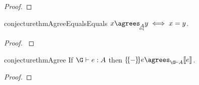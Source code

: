 
\begin{proof}
\end{proof}

\begin{restatable}{conjecture}{thmAgreeEqualsEquals}
  \(x \agrees_{\eqt A} y \iff x = y\).
\end{restatable}
\begin{proof}
  \label{thm:agree-equals-equals}
\end{proof}

\begin{restatable}{conjecture}{thmAgree}
  If $\J e \G A$
  then $\incdens{e} \agrees_{\G \vdash A} \den{e}$.
\end{restatable}
\begin{proof}
\end{proof}




